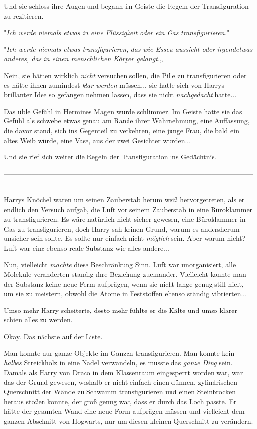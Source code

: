 {Und sie schloss ihre Augen und begann im Geiste die Regeln der Transfiguration zu rezitieren.

"\emph{Ich werde niemals etwas in eine Flüssigkeit oder ein Gas} \emph{transfigurieren.}"

"\emph{Ich werde niemals etwas transfigurieren, das wie Essen aussieht oder irgendetwas anderes, das in einen menschlichen Körper gelangt.}„

Nein, sie hätten wirklich \emph{nicht} versuchen sollen, die Pille zu transfigurieren oder es hätte ihnen zumindest \emph{klar werden} müssen... sie hatte sich von Harrys brillanter Idee so gefangen nehmen lassen, dass sie nicht \emph{nachgedacht} hatte...

Das üble Gefühl in Hermines Magen wurde schlimmer. Im Geiste hatte sie das Gefühl als schwebe etwas genau am Rande ihrer Wahrnehmung, eine Auffassung, die davor stand, sich ins Gegenteil zu verkehren, eine junge Frau, die bald ein altes Weib würde, eine Vase, aus der zwei Gesichter wurden...

Und sie rief sich weiter die Regeln der Transfiguration ins Gedächtnis.

--------------------------------------------------------------------------------------------------------------------------------------------

\hfill\break Harrys Knöchel waren um seinen Zauberstab herum weiß hervorgetreten, als er endlich den Versuch aufgab, die Luft vor seinem Zauberstab in eine Büroklammer zu transfigurieren. Es wäre natürlich nicht sicher gewesen, eine Büroklammer in Gas zu transfigurieren, doch Harry sah keinen Grund, warum es andersherum unsicher sein sollte. Es sollte nur einfach nicht \emph{möglich} sein. Aber warum nicht? Luft war eine ebenso reale Substanz wie alles andere...

Nun, vielleicht \emph{machte} diese Beschränkung Sinn. Luft war unorganisiert, alle Moleküle veränderten ständig ihre Beziehung zueinander. Vielleicht konnte man der Substanz keine neue Form aufprägen, wenn sie nicht lange genug still hielt, um sie zu meistern, obwohl die Atome in Feststoffen ebenso ständig vibrierten...

Umso mehr Harry scheiterte, desto mehr fühlte er die Kälte und umso klarer schien alles zu werden.

Okay. Das nächste auf der Liste.

Man konnte nur ganze Objekte im Ganzen transfigurieren. Man konnte kein \emph{halbes} Streichholz in eine Nadel verwandeln, es musste das \emph{ganze Ding} sein. Damals als Harry von Draco in dem Klassenraum eingesperrt worden war, war das der Grund gewesen, weshalb er nicht einfach einen dünnen, zylindrischen Querschnitt der Wände zu Schwamm transfigurieren und einen Steinbrocken heraus stoßen konnte, der groß genug war, dass er durch das Loch passte. Er hätte der gesamten Wand eine neue Form aufprägen müssen und vielleicht dem ganzen Abschnitt von Hogwarts, nur um diesen kleinen Querschnitt zu verändern.

}

